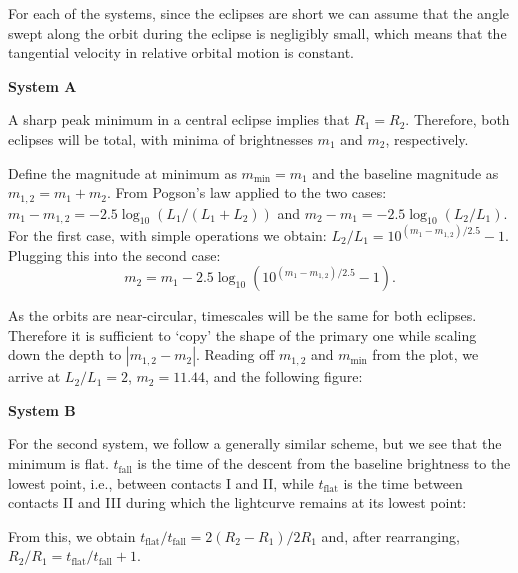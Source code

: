
For each of the systems, since the eclipses are short we can assume that the
angle swept along the orbit during the eclipse is negligibly small, which means
that the tangential velocity in relative orbital motion is constant.

\medskip
\noindent\textbf{System A}

A sharp peak minimum in a central eclipse implies that $R_1 = R_2$. Therefore,
both eclipses will be total, with minima of brightnesses $m_1$ and $m_2$,
respectively.

Define the magnitude at minimum as $m_{\min} = m_1$ and the baseline magnitude
as $m_{1,2} = m_1 + m_2$.
From Pogson's law applied to the two cases:
$m_1 - m_{1,2} = -2.5\log_{10}\left(L_1/(L_1 + L_2)\right)$ and
$m_2 - m_1 = -2.5\log_{10}\left(L_2/L_1\right)$. For the first case, with
simple operations we obtain: $L_2/L_1 = 10^{(m_1 - m_{1,2})/2.5} - 1$.
Plugging this into the second case:
\[ m_2 = m_1 - 2.5\log_{10}\left(10^{(m_1 - m_{1,2})/2.5} - 1\right). \]

As the orbits are near-circular, timescales will be the same for both eclipses.
Therefore it is sufficient to `copy' the shape of the primary one while scaling
down the depth to $|m_{1,2} - m_2|$. Reading off $m_{1,2}$ and $m_{\min}$ from
the plot, we arrive at $L_2/L_1 = 2$, $m_2 = 11.44$, and the following figure:


\medskip
\noindent\textbf{System B}

For the second system, we follow a generally similar scheme, but we see that
the minimum is flat. $t_{\mathrm{fall}}$ is the time of the descent from the
baseline brightness to the lowest point, i.e., between contacts I and II, while
$t_{\mathrm{flat}}$ is the time between contacts II and III during which the
lightcurve remains at its lowest point:


From this, we obtain
$t_{\mathrm{flat}}/t_{\mathrm{fall}} = 2(R_2 - R_1)/2R_1$ and, after
rearranging, $R_2/R_1 = t_{\mathrm{flat}}/t_{\mathrm{fall}} + 1$.

